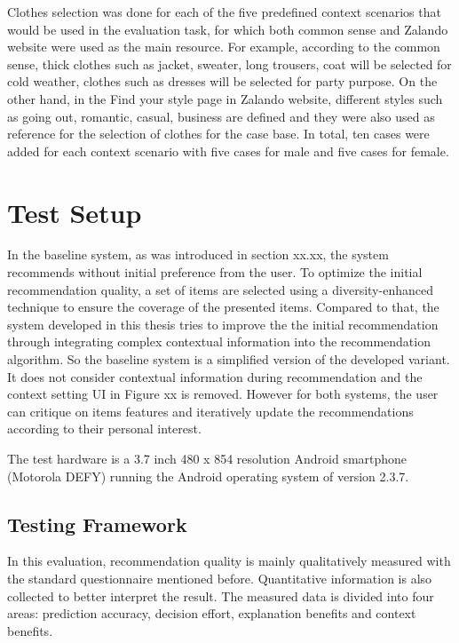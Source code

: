 Clothes selection was done for each of the five predefined context scenarios that would be used in the evaluation task, for which both common sense and Zalando website were used as the main resource. For example, according to the common sense, thick clothes such as jacket, sweater, long trousers, coat will be selected for cold weather, clothes such as dresses will be selected for party purpose. On the other hand,  in the Find your style page in Zalando website, different styles such as going out, romantic, casual, business are defined and they were also used as reference for the selection of clothes for the case base. In total, ten cases were added for each context scenario with five cases for male and five cases for female. 

\section{Test Setup} \label{sec:ts}

In the baseline system, as was introduced in section xx.xx, the system recommends without initial preference from the user. To optimize the initial recommendation quality,  a set of items are selected using a diversity-enhanced technique to ensure the coverage of the presented items. Compared to that, the system developed in this thesis tries to improve the the initial recommendation through integrating complex contextual information into the recommendation algorithm. So the baseline system is a simplified version of the developed variant. It does not consider contextual information during recommendation and the context setting UI in Figure xx is removed. However for both systems, the user can critique on items features and iteratively update the recommendations according to their personal interest. 

The test hardware is a 3.7 inch 480 x 854 resolution Android smartphone (Motorola DEFY) running the Android operating system of version 2.3.7.

\subsection{Testing Framework} \label{sec:ts_tf}

In this evaluation, recommendation quality is mainly qualitatively measured with the standard questionnaire mentioned before. Quantitative information is also collected to better interpret the result. The measured data is divided into four areas: prediction accuracy, decision effort, explanation benefits and context benefits.

